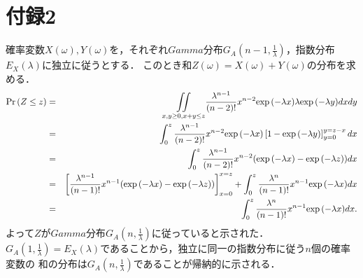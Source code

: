 \documentclass[a4j,papersize,disablejfam,slide,14pt]{jsarticle}
\def\exp#1{\mbox{${\rm exp} \left( #1 \right)$}} %
\def\prob#1{\mbox{${\rm Pr} \left( #1 \right)$}} %
\begin{document}
\section{付録2}
	確率変数$X(\omega),Y(\omega)$を，それぞれ$Gamma$分布$G_A(n-1, \frac{1}{\lambda})$，指数分布$E_X(\lambda)$に独立に従うとする．
    このとき和$Z(\omega) = X(\omega) + Y(\omega)$の分布を求める．
    \begin{eqnarray}
    	\prob{Z \leq z} &=& \underset{x,y \geq 0, x + y \leq z}{\iint} \frac{\lambda^{n-1}}{(n-2)!}x^{n-2}\exp{-\lambda x} \lambda \exp{-\lambda y} dxdy \\
        &=& \int_{0}^{z} \frac{\lambda^{n-1}}{(n-2)!}x^{n-2}\exp{-\lambda x} \left[ 1 - \exp{-\lambda y} \right]_{y=0}^{y = z - x} dx \\
        &=& \int_{0}^{z} \frac{\lambda^{n-1}}{(n-2)!}x^{n-2}(\exp{-\lambda x} - \exp{-\lambda z}) dx \\
        &=& \left[ \frac{\lambda^{n-1}}{(n-1)!}x^{n-1}(\exp{-\lambda x} - \exp{-\lambda z}) \right]_{x=0}^{x=z} + \int_{0}^{z} \frac{\lambda^n}{(n-1)!}x^{n-1}\exp{-\lambda x} dx \\
        &=& \int_{0}^{z} \frac{\lambda^n}{(n-1)!}x^{n-1}\exp{-\lambda x} dx.
    \end{eqnarray}
    よって$Z$が$Gamma$分布$G_A(n, \frac{1}{\lambda})$に従っていると示された．$G_A(1, \frac{1}{\lambda}) = E_X(\lambda)$であることから，独立に同一の指数分布に従う$n$個の確率変数の
    和の分布は$G_A(n, \frac{1}{\lambda})$であることが帰納的に示される．

\newpage
\end{document}
